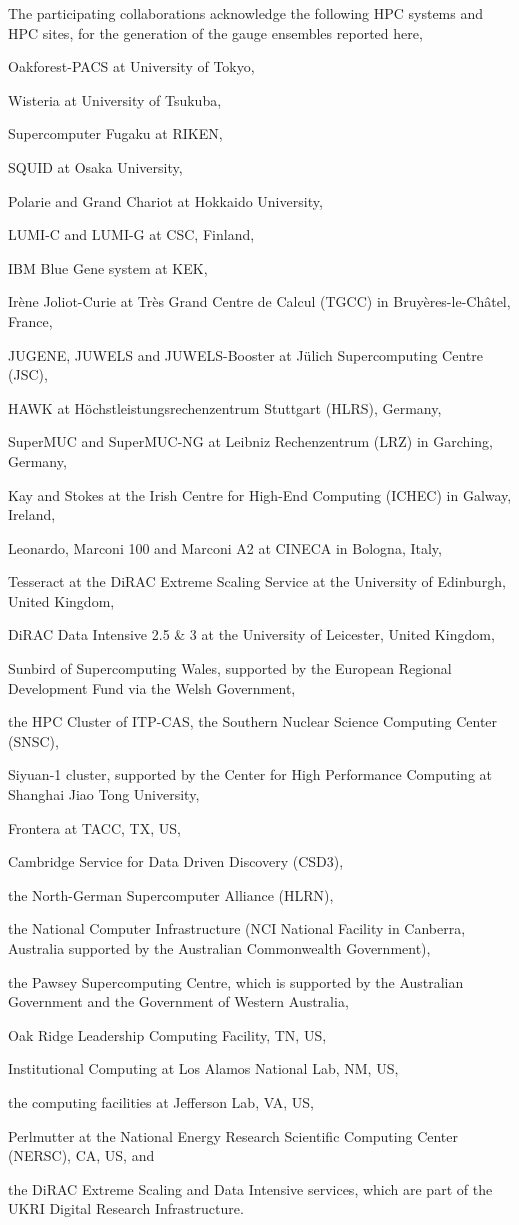 \documentclass[a4paper,11pt]{article}
\begin{document}
The participating collaborations acknowledge the following HPC systems
and HPC sites, for the generation of the gauge ensembles reported
here,\par Oakforest-PACS at University of Tokyo,\par Wisteria at
University of Tsukuba,\par Supercomputer Fugaku at RIKEN, \par SQUID
at Osaka University,\par Polarie and Grand Chariot at Hokkaido
University,\par LUMI-C and LUMI-G at CSC, Finland,\par IBM Blue Gene
system at KEK,\par Irène Joliot-Curie at Très Grand Centre de Calcul
(TGCC) in Bruyères-le-Châtel, France,\par JUGENE, JUWELS and
JUWELS-Booster at Jülich Supercomputing Centre (JSC),\par HAWK at
Höchstleistungsrechenzentrum Stuttgart (HLRS), Germany,\par SuperMUC
and SuperMUC-NG at Leibniz Rechenzentrum (LRZ) in Garching,
Germany,\par Kay and Stokes at the Irish Centre for High-End Computing
(ICHEC) in Galway, Ireland,\par Leonardo, Marconi 100 and Marconi A2
at CINECA in Bologna, Italy,\par Tesseract at the DiRAC Extreme
Scaling Service at the University of Edinburgh, United Kingdom,\par
DiRAC Data Intensive 2.5 \& 3 at the University of Leicester, United
Kingdom,\par Sunbird of Supercomputing Wales, supported by the
European Regional Development Fund via the Welsh Government,\par the
HPC Cluster of ITP-CAS, the Southern Nuclear Science Computing Center
(SNSC),\par Siyuan-1 cluster, supported by the Center for High
Performance Computing at Shanghai Jiao Tong University, \par Frontera
at TACC, TX, US,\par Cambridge Service for Data Driven Discovery
(CSD3),\par the North-German Supercomputer Alliance (HLRN),\par the
National Computer Infrastructure (NCI National Facility in Canberra,
Australia supported by the Australian Commonwealth Government),\par
the Pawsey Supercomputing Centre, which is supported by the Australian
Government and the Government of Western Australia, \par Oak Ridge
Leadership Computing Facility, TN, US, \par Institutional Computing at Los
Alamos National Lab, NM, US, \par the computing facilities at
Jefferson Lab, VA, US, \par Perlmutter at the National Energy Research
Scientific Computing Center (NERSC), CA, US, and \par the DiRAC
Extreme Scaling and Data Intensive services, which are part of the
UKRI Digital Research Infrastructure.




\end{document}
